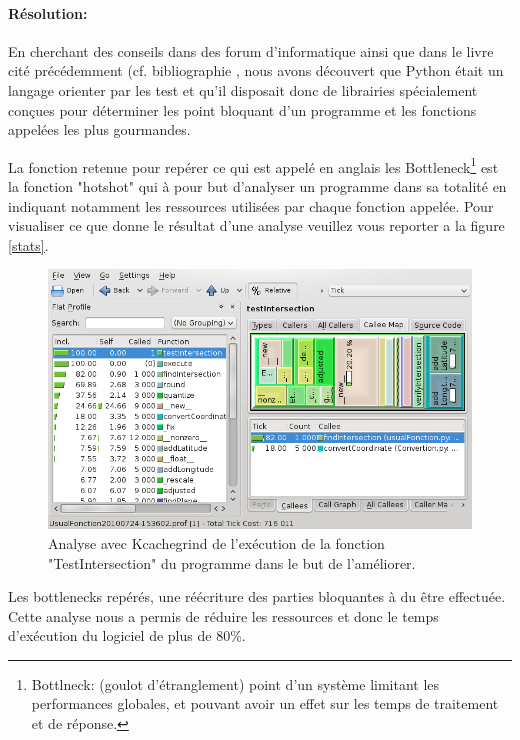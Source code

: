             \paragraph{Résolution:}
En cherchant des conseils dans des forum d'informatique ainsi que dans le livre cité précédemment (cf. bibliographie \cite{pybook}, nous avons découvert que Python était un langage orienter par les test et qu'il disposait donc de librairies spécialement conçues pour déterminer les point bloquant d'un programme et les fonctions appelées les plus gourmandes.

La fonction retenue pour repérer ce qui est appelé en anglais les Bottleneck\footnote{Bottlneck: (goulot d'étranglement) point d'un système limitant les performances globales, et pouvant avoir un effet sur les temps de traitement et de réponse.} est la fonction "hotshot" qui à pour but d'analyser un programme dans sa totalité en indiquant notamment les ressources utilisées par chaque fonction appelée. Pour visualiser ce que donne le résultat d'une analyse veuillez vous reporter a la figure \vref{stats}.
\begin{figure}
\center
\includegraphics[width=15cm]{images/stats.png}
\caption{Analyse avec Kcachegrind de l'exécution de la fonction "TestIntersection" du programme dans le but de l'améliorer.}
\label{stats}
\end{figure}

Les bottlenecks repérés, une réécriture des parties bloquantes à du être effectuée. Cette analyse nous a permis de réduire les ressources et donc le temps d'exécution du logiciel de plus de 80\%.
